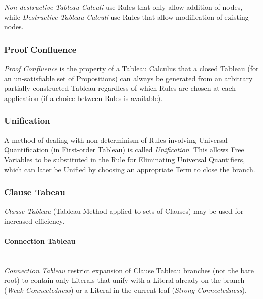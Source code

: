 \emph{Non-destructive Tableau Calculi} use Rules that only allow
addition of nodes, while \emph{Destructive Tableau Calculi} use Rules
that allow modification of existing nodes.



\subsubsection{Proof Confluence} \label{sec:proof_confluence}

\emph{Proof Confluence} is the property of a Tableau Calculus that a
closed Tableau (for an un-satisfiable set of Propositions) can always
be generated from an arbitrary partially constructed Tableau
regardless of which Rules are chosen at each application (if a choice
between Rules is available).



\subsubsection{Unification} \label{sec:tableau_unification}

A method of dealing with non-determinism of Rules involving Universal
Quantification (in First-order Tableau) is called \emph{Unification}.
This allows Free Variables to be substituted in the Rule for
Eliminating Universal Quantifiers, which can later be Unified by
choosing an appropriate Term to close the branch.



\subsubsection{Clause Tabeau} \label{sec:clause_tableau}

\emph{Clause Tableau} (Tableau Method applied to sets of Clauses) may
be used for increased efficiency.



\paragraph{Connection Tableau} \label{sec:connection_tableau}
\hfill \\

\emph{Connection Tableau} restrict expansion of Clause Tableau
branches (not the bare root) to contain only Literals that unify with
a Literal already on the branch (\emph{Weak Connectedness}) or a
Literal in the current leaf (\emph{Strong Connectedness}).



